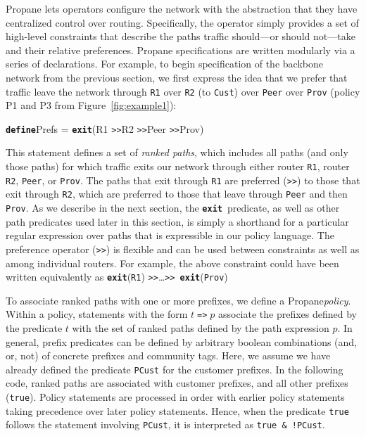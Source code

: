 \documentclass[10pt]{sigalternate052015}
\newcommand{\sysname}{{\small \sf Propane}\xspace}
\newcommand{\CD}[1]{\texttt{\small #1}}  %
\newcommand{\KW}[1]{\texttt{\small\bfseries{#1}}}
\newcommand{\True}{\CD{true}}
\newcommand{\Define}{\KW{define}}
\newcommand{\Prefer}{\texttt{>>}}
\newcommand{\Path}{\texttt{=>}}
\newcommand{\AND}{\texttt{\&}}
\newcommand{\NOT}{\texttt{!}}
\newcommand{\Exit}{\KW{exit}}
\begin{document}
\sysname lets operators configure the network with the
abstraction that they have centralized control over routing.
Specifically, the operator simply provides a set of high-level constraints
that describe the
paths traffic should---or should not---take and their relative preferences.
\sysname specifications are written modularly via a series
of declarations.
For example, to begin specification of the backbone
network from the previous section, we first express the idea that
we prefer that traffic leave the network through \CD{R1} over \CD{R2} (to \CD{Cust}) over \CD{Peer} over \CD{Prov} (policy P1 and P3 from Figure~\ref{fig:example1}):
\begin{code}
\Define Prefs = \Exit(R1 \Prefer R2 \Prefer Peer \Prefer Prov)
\end{code}
This  statement defines a set of \emph{ranked paths}, which includes
all paths (and only those paths) for which traffic exits our network
through either router \CD{R1}, router \CD{R2}, \CD{Peer}, or \CD{Prov}.
The paths that exit through \CD{R1}
are preferred (\Prefer) to those that exit through \CD{R2}, which are preferred to those that
leave through \CD{Peer} and then \CD{Prov}.  As we
describe in the next section, the \Exit\ predicate, as well as other
path predicates used later in this section, is simply a shorthand for
a particular regular expression over paths that is expressible in our policy
language. The preference operator (\Prefer) is flexible and can be used between constraints as well as among individual routers. For example, the above constraint could have been written equivalently as
\Exit(\CD{R1}) \Prefer \ldots \Prefer ~\Exit(\CD{Prov})

To associate ranked paths with
one or more prefixes, we define a \sysname \emph{policy}.
Within a policy, statements with the form $t\;$\Path$\;p$
associate the prefixes defined by the predicate $t$ with the set of
ranked paths defined by the path expression $p$.  In general,
prefix predicates can be defined by arbitrary boolean combinations
(and, or, not) of concrete prefixes and community tags.  Here,
we assume we have already defined the predicate \CD{PCust} for the
customer prefixes.
In the following code, ranked paths are associated with
customer prefixes,
and all other prefixes (\CD{true}). Policy statements are processed in
order with earlier policy statements taking precedence over later
policy statements. Hence, when the predicate \True{} follows
the statement involving \CD{PCust}, it is interpreted as
\CD{\True{} \AND{} \NOT{}PCust}.
\end{document}
